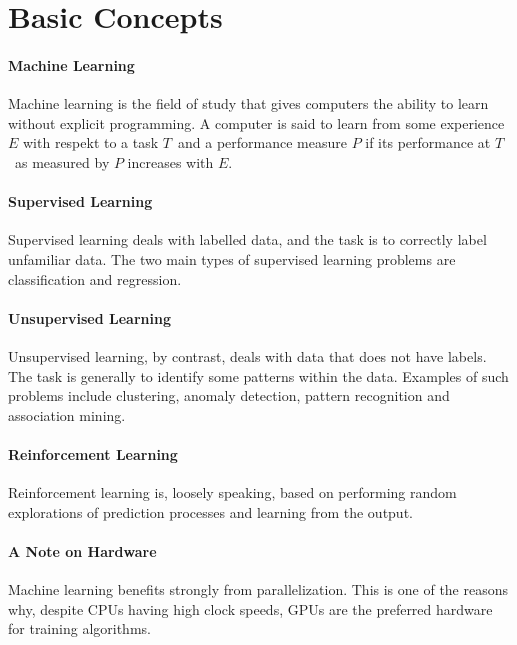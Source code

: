 \section{Basic Concepts}

\paragraph{Machine Learning}
Machine learning is the field of study that gives computers the ability to learn without explicit programming. A computer is said to learn from some experience $E$ with respekt to a task $T$ and a performance measure $P$ if its performance at $T$ as measured by $P$ increases with $E$.

\paragraph{Supervised Learning}
Supervised learning deals with labelled data, and the task is to correctly label unfamiliar data. The two main types of supervised learning problems are classification and regression.

\paragraph{Unsupervised Learning}
Unsupervised learning, by contrast, deals with data that does not have labels. The task is generally to identify some patterns within the data. Examples of such problems include clustering, anomaly detection, pattern recognition and association mining.

\paragraph{Reinforcement Learning}
Reinforcement learning is, loosely speaking, based on performing random explorations of prediction processes and learning from the output.

\paragraph{A Note on Hardware}
Machine learning benefits strongly from parallelization. This is one of the reasons why, despite CPUs having high clock speeds, GPUs are the preferred hardware for training algorithms.

